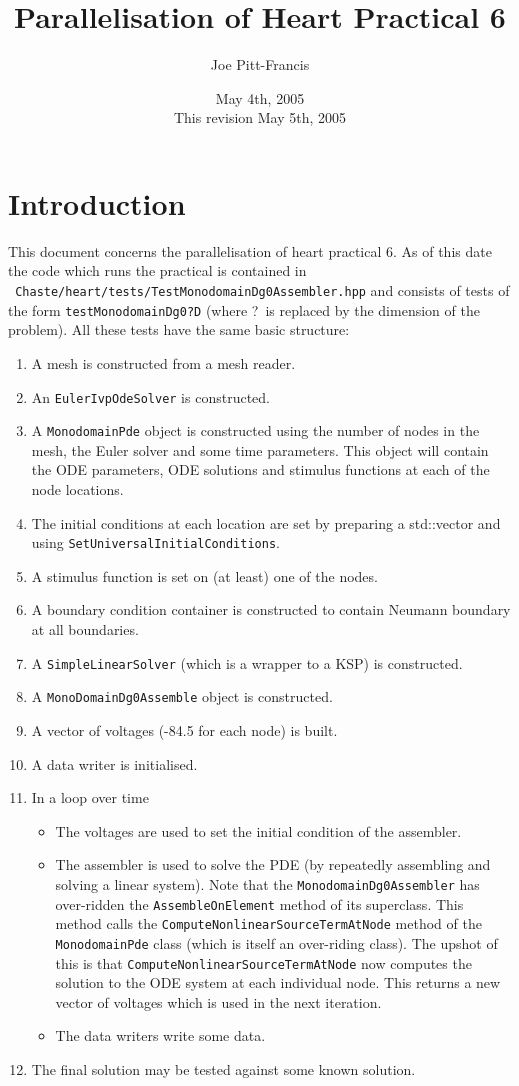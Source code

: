 \documentclass{article}
\author{Joe Pitt-Francis}
\title{Parallelisation of Heart Practical 6}
\date{ May 4th, 2005\\{\tiny This revision May 5th, 2005}}
\begin{document}
\maketitle
\section{Introduction}

This document concerns the parallelisation of heart practical 6.  As of
this date the code which runs the practical is contained in \\
{\tt
Chaste/heart/tests/TestMonodomainDg0Assembler.hpp} and consists of tests
of the form {\tt testMonodomainDg0?D} (where ?\ is replaced by the
dimension of the problem).  All these tests have the same basic
structure:
\begin{enumerate}
\item
A mesh is constructed from a mesh reader.
\item 
An {\tt EulerIvpOdeSolver} is constructed.
\item 
A {\tt MonodomainPde} object is constructed using the number of
nodes in the mesh, the Euler solver and some time parameters.  This
object will contain the ODE parameters, ODE solutions and stimulus
functions at each of the node locations.
\item
The initial conditions at each location are set by preparing a std::vector
and using {\tt SetUniversalInitialConditions}.
\item
A stimulus function is set on (at least) one of the nodes.
\item
A boundary condition container is constructed to contain Neumann
boundary at all boundaries.
\item
A {\tt SimpleLinearSolver} (which is a wrapper to a KSP) is
constructed.
\item A {\tt MonoDomainDg0Assemble} object is constructed.
\item A vector of voltages (-84.5  for each node) is built.
\item A data writer is initialised.
\item In a loop over time
\begin{itemize}
\item The voltages are used to set the initial condition of the
assembler.
\item The assembler is used to solve the PDE (by repeatedly assembling
and solving a linear system). 
Note that the {\tt MonodomainDg0Assembler} has over-ridden the {\tt AssembleOnElement} method of its superclass.
This method calls the {\tt ComputeNonlinearSourceTermAtNode} method of the {\tt  MonodomainPde} class (which is 
itself an over-riding class).  The upshot of this is that {\tt ComputeNonlinearSourceTermAtNode} now computes the 
solution to the ODE  system at each individual node.
This returns a new vector of voltages
which is used in the next iteration.
\item The data writers write some data.
\end{itemize}
\item The final solution may be tested against some known solution.
\end{enumerate}
\end{document}
